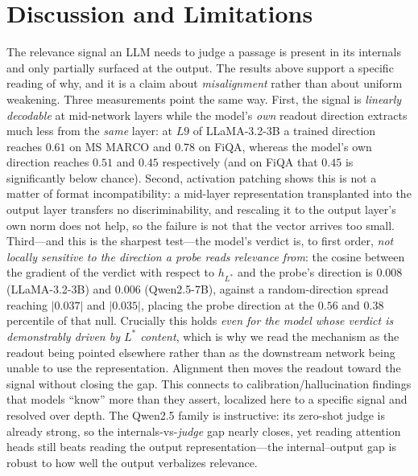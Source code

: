 \documentclass[11pt]{article}
\begin{document}
\section{Discussion and Limitations}
The relevance signal an LLM needs to judge a passage is present in its
internals and only partially surfaced at the output. The results above support a
specific reading of why, and it is a claim about \emph{misalignment} rather than
about uniform weakening. Three measurements point the same way. First, the
signal is \emph{linearly decodable} at mid-network layers while the model's
\emph{own} readout direction extracts much less from the \emph{same} layer: at
$L9$ of LLaMA-3.2-3B a trained direction reaches $0.61$ on MS MARCO and $0.78$
on FiQA, whereas the model's own direction reaches $0.51$ and $0.45$
respectively (and on FiQA that $0.45$ is significantly below chance). Second,
activation patching shows this is not a matter of format incompatibility: a
mid-layer representation transplanted into the output layer transfers no
discriminability, and rescaling it to the output layer's own norm does not help,
so the failure is not that the vector arrives too small. Third---and this is the
sharpest test---the model's verdict is, to first order, \emph{not locally
sensitive to the direction a probe reads relevance from}: the cosine between the
gradient of the verdict with respect to $h_{L^*}$ and the probe's direction is
$0.008$ (LLaMA-3.2-3B) and $0.006$ (Qwen2.5-7B), against a random-direction
spread reaching $|0.037|$ and $|0.035|$, placing the probe direction at the
$0.56$ and $0.38$ percentile of that null. Crucially this holds \emph{even for
the model whose verdict is demonstrably driven by $L^*$ content}, which is why
we read the mechanism as the readout being pointed elsewhere rather than as the
downstream network being unable to use the representation. Alignment then moves
the readout toward the signal without closing the gap. This connects to
calibration/hallucination findings that models ``know'' more than they assert,
localized here to a specific signal and resolved over depth. The Qwen2.5 family
is instructive: its zero-shot judge is already strong, so the
internals-vs-\emph{judge} gap nearly closes, yet reading attention heads still
beats reading the output representation---the internal--output gap is robust to
how well the output verbalizes relevance.
\end{document}
